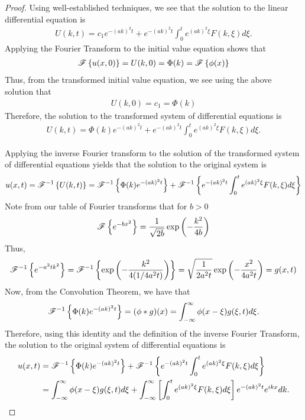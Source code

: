 \begin{proof}
  Using well-established techniques, we see that the solution to the linear differential equation is
  \begin{align*}
    U(k, t) = c_1 e^{-(ak)^2 t} + e^{-(ak)^2 t}\int_0^t e^{(ak)^2 \xi} F(k, \xi) d\xi.
  \end{align*}
  Applying the Fourier Transform to the initial value equation shows that
  \begin{align*}
    \mathscr{F}\left\{ {u(x, 0)} \right\} = U(k, 0) = \Phi(k) = \mathscr{F}\left\{ {\phi(x)} \right\}
  \end{align*}
  Thus, from the transformed initial value equation, we see using the above solution that
  \begin{align*}
    U(k, 0) = c_1 = \Phi(k)
  \end{align*}
  Therefore, the solution to the transformed system of differential equations
  is
  \begin{align*}
    U(k, t) = \Phi(k)e^{-(ak)^2 t}+ e^{-(ak)^2 t}\int_0^t e^{(ak)^2 \xi} F(k, \xi) d\xi.
  \end{align*}

  Applying the inverse Fourier transform to the solution of the transformed system of differential equations
  yields that the solution to the original system is
  \begin{align*}
    u(x, t) = \mathscr{F}^{-1}\left\{ {U(k, t)} \right\} = \mathscr{F}^{-1}\left\{ {\Phi(k)e^{-(ak)^2 t}} \right\} + \mathscr{F}^{-1}\left\{ {e^{-(ak)^2 t}\int_0^t e^{(ak)^2 \xi} F(k, \xi) d\xi} \right\}
  \end{align*}
  Note from our table of Fourier transforms that for $b>0$
  \begin{align*}
    \mathscr{F}\left\{ {e^{-b x^2}} \right\} =\frac{1}{\sqrt{2b}} \exp\left(-\frac{k^2}{4b}\right)
  \end{align*}
  Thus,
  \begin{align*}
    \mathscr{F}^{-1}\left\{ {e^{-a^2 t k^2}} \right\} = \mathscr{F}^{-1}\left\{ {\exp\left(- \frac{k^2}{4(1/4a^2 t)}\right)} \right\} = \sqrt{\frac{1}{2a^2 t}} \exp\left(-\frac{x^2}{4a^2 t}\right) = g(x, t)
  \end{align*}
  Now, from the Convolution Theorem, we have that
  \begin{align*}
    \mathscr{F}^{-1}\left\{ {\Phi(k)e^{-(ak)^2 t}} \right\} = (\phi \ast g)(x) = \int_{-\infty}^\infty \phi(x-\xi) g(\xi, t)d\xi.
  \end{align*}
  Therefore, using this identity and the definition of the inverse Fourier Transform, the solution to the original system
  of differential equations is
  \begin{align*}
    u(x, t) &= \mathscr{F}^{-1}\left\{ {\Phi(k)e^{-(ak)^2 t}} \right\} + \mathscr{F}^{-1}\left\{ {e^{-(ak)^2 t}\int_0^t e^{(ak)^2 \xi} F(k, \xi) d\xi} \right\} \\
    &= \int_{-\infty}^\infty \phi(x-\xi) g(\xi, t)d\xi + \int_{-\infty}^{\infty}\left[\int_0^t e^{(ak)^2 \xi} F(k, \xi) d\xi\right]e^{-(ak)^2 t} e^{ikx} dk.
  \end{align*}
\end{proof}
\newpage

